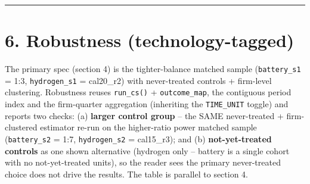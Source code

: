\documentclass[
]{article}
\begin{document}
\begin{center}\rule{0.5\linewidth}{0.5pt}\end{center}

\section{6. Robustness
(technology-tagged)}\label{robustness-technology-tagged}

The primary spec (section 4) is the tighter-balance matched sample
(\texttt{battery\_s1} = 1:3, \texttt{hydrogen\_s1} = cal20\_r2) with
never-treated controls + firm-level clustering. Robustness reuses
\texttt{run\_cs()} + \texttt{outcome\_map}, the contiguous period index
and the firm-quarter aggregation (inheriting the \texttt{TIME\_UNIT}
toggle) and reports two checks: (a) \textbf{larger control group} -- the
SAME never-treated + firm-clustered estimator re-run on the higher-ratio
power matched sample (\texttt{battery\_s2} = 1:7, \texttt{hydrogen\_s2}
= cal15\_r3); and (b) \textbf{not-yet-treated controls} as one shown
alternative (hydrogen only -- battery is a single cohort with no
not-yet-treated units), so the reader sees the primary never-treated
choice does not drive the results. The table is parallel to section 4.
\end{document}
